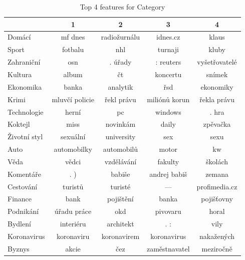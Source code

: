 \begin{table}
\centering
\caption{Top 4 features for Category}
\label{tab:top4_category}
\begin{tabular}{lcccc}
\toprule
{} &               1 &                2 &              3 &               4 \\
\midrule
Domácí         &         mf dnes &     radiožurnálu &       idnes.cz &           klaus \\
Sport          &         fotbalu &              nhl &        turnaji &           kluby \\
Zahraniční     &             osn &          . úřady &      : reuters &   vyšetřovatelé \\
Kultura        &           album &               čt &       koncertu &          snímek \\
Ekonomika      &           banka &         analytik &            řsd &       ekonomiky \\
Krimi          &  mluvčí policie &       řekl právu &  miliónů korun &     řekla právu \\
Technologie    &           herní &               pc &        windows &           . hra \\
Koktejl        &            miss &         novinkám &          daily &        zpěvačka \\
Životní styl   &        sexuální &       university &            sex &            sexu \\
Auto           &     automobilky &       automobilů &          motor &              kw \\
Věda           &           vědci &       vzdělávání &        fakulty &         školách \\
Komentáře      &             . ) &           babiše &   andrej babiš &          zemana \\
Cestování      &         turistů &          turisté &              — &   profimedia.cz \\
Finance        &            bank &        pojištění &          banka &      pojišťovny \\
Podnikání      &     úřadu práce &              okd &       pivovaru &           horal \\
Bydlení        &       interiéru &        architekt &            . : &            vily \\
Koronavirus    &      koronaviru &      koronavirem &    koronavirus &      nakažených \\
Byznys         &           akcie &              čez &  zaměstnavatel &       meziročně \\

\end{tabular}
\end{table}
